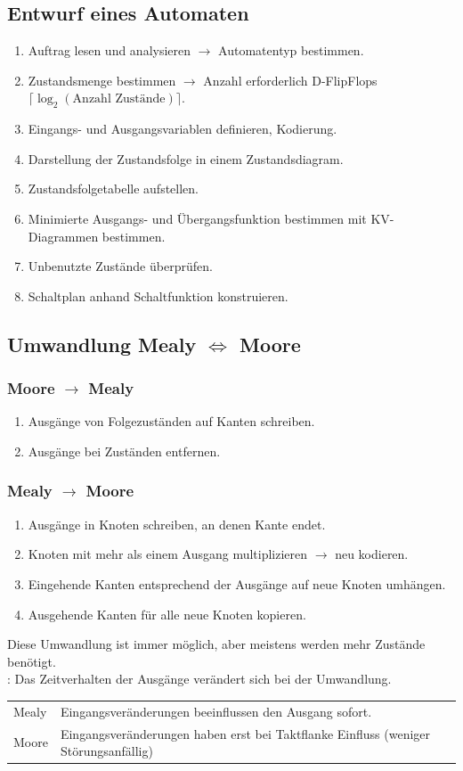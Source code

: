 \subsection{Entwurf eines Automaten}
\begin{enumerate}
    \item Auftrag lesen und analysieren $\rightarrow$ Automatentyp bestimmen.
    \item Zustandsmenge bestimmen $\rightarrow$ Anzahl erforderlich D-FlipFlops $\lceil \log_2(\text{Anzahl Zustände}) \rceil$.
    \item Eingangs- und Ausgangsvariablen definieren, Kodierung.
    \item Darstellung der Zustandsfolge in einem Zustandsdiagram.
    \item Zustandsfolgetabelle aufstellen.
    \item Minimierte Ausgangs- und Übergangsfunktion bestimmen mit KV-Diagrammen bestimmen.
    \item Unbenutzte Zustände überprüfen.
    \item Schaltplan anhand Schaltfunktion konstruieren.
\end{enumerate}
\subsection{Umwandlung Mealy $\Leftrightarrow$ Moore}
\subsubsection{Moore $\rightarrow$ Mealy}
\begin{enumerate}
    \item Ausgänge von Folgezuständen auf Kanten schreiben.
    \item Ausgänge bei Zuständen entfernen.
\end{enumerate}
\subsubsection{Mealy $\rightarrow$ Moore}
\begin{enumerate}
    \item Ausgänge in Knoten schreiben, an denen Kante endet.
    \item Knoten mit mehr als einem Ausgang multiplizieren $\rightarrow$ neu kodieren.
    \item Eingehende Kanten entsprechend der Ausgänge auf neue Knoten umhängen.
    \item Ausgehende Kanten für alle neue Knoten kopieren.
\end{enumerate}
Diese Umwandlung ist immer möglich, aber meistens werden mehr Zustände benötigt.\\
: Das Zeitverhalten der Ausgänge verändert sich bei der Umwandlung.
\begin{flushleft}
    \begin{tabular}{l p{50mm}}
        Mealy & Eingangsveränderungen beeinflussen den Ausgang sofort.\\
        Moore & Eingangsveränderungen haben erst bei Taktflanke Einfluss (weniger Störungsanfällig)
    \end{tabular}
\end{flushleft}

